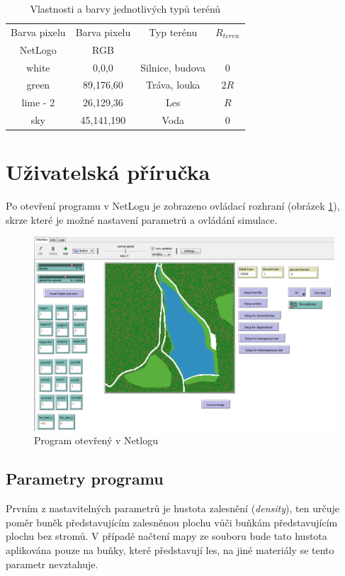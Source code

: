 \documentclass[11pt,a4paper]{scrartcl}
\begin{document}
	\begin{table}[H]
		\centering
		\begin{tabular}{|c|c|c|c|}
		\hline
		Barva pixelu & Barva pixelu & Typ terénu & $R_{teren}$ \\
		NetLogo & RGB & & \\
		\hline
		\hline
		white & 0,0,0 & Silnice, budova & 0 \\
		\hline
		green & 89,176,60 & Tráva, louka & $2R$ \\
		\hline 
		lime - 2 &  26,129,36 & Les & $R$ \\
		\hline
		sky & 45,141,190 & Voda & 0 \\
		\hline
		\end{tabular}
		\caption{Vlastnosti a barvy jednotlivých typů terénů}
		\label{tab:terrain-types}
	\end{table}
	
	
	\section{Uživatelská příručka}
	Po otevření programu v NetLogu je zobrazeno ovládací rozhraní (obrázek \ref{fig:netlog-interface}), skrze které je možné nastavení parametrů a ovládání simulace.
	
	\begin{figure}[H]
		\centering
		\includegraphics[width=14.5cm]{interface}
		\caption{Program otevřený v Netlogu}
		\label{fig:netlog-interface}
	\end{figure}
	
	\subsection{Parametry programu}
	Prvním z nastavitelných parametrů je hustota zalesnění (\textit{density}), ten určuje poměr buněk představujícím zalesněnou plochu vůči buňkám představujícím plochu bez stromů. V případě načtení mapy ze souboru bude tato hustota aplikována pouze na buňky, které představují les, na jiné materiály se tento parametr nevztahuje.
	
\end{document}
